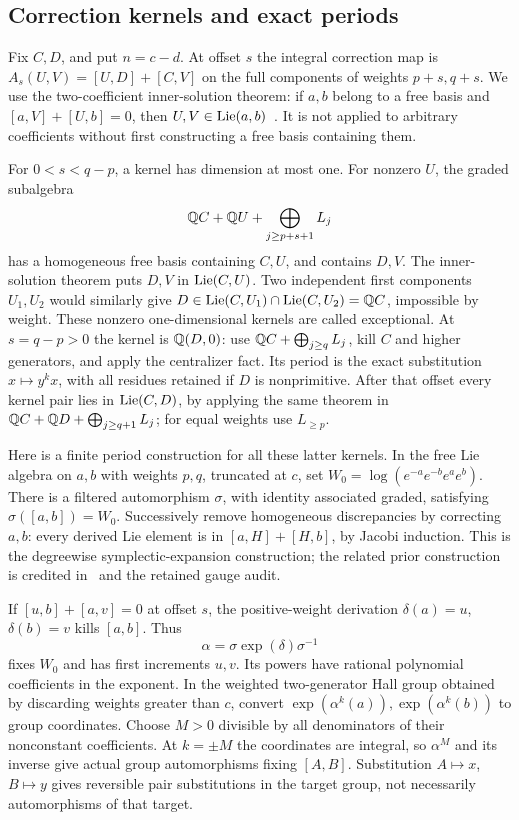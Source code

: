 \subsection{Correction kernels and exact periods}
Fix $C,D$, and put $n=c-d$. At offset $s$ the integral correction
map is $A_s(U,V)=[U,D]+[C,V]$ on the full components of weights
$p+s,q+s$. We use the two-coefficient inner-solution theorem:
if $a,b$ belong to a free basis and $[a,V]+[U,b]=0$, then
$U,V\in\operatorname{Lie}(a,b)$~\cite{remeslennikov-stoehr,altassan}. It is
not applied to arbitrary coefficients without first constructing
a free basis containing them.

For $0<s<q-p$, a kernel has dimension at most one. For nonzero
$U$, the graded subalgebra
\[
 \mathbb Q C+\mathbb Q U+\bigoplus_{j\ge p+s+1}L_j
\]
has a homogeneous free basis containing $C,U$, and contains $D,V$.
The inner-solution theorem puts $D,V$ in $\operatorname{Lie}(C,U)$. Two independent
first components $U_1,U_2$ would similarly give
$D\in\operatorname{Lie}(C,U_1)\cap\operatorname{Lie}(C,U_2)=\mathbb Q C$, impossible by weight.
These nonzero one-dimensional kernels are called exceptional.
At $s=q-p>0$ the kernel is $\mathbb Q(D,0)$: use
$\mathbb Q C+\bigoplus_{j\ge q}L_j$, kill $C$ and higher generators,
and apply the centralizer fact. Its period is the exact substitution
$x\mapsto y^kx$, with all residues retained if $D$ is nonprimitive.
After that offset every kernel pair lies in $\operatorname{Lie}(C,D)$, by applying
the same theorem in
$\mathbb Q C+\mathbb Q D+\bigoplus_{j\ge q+1}L_j$; for equal weights use
$L_{\ge p}$.

Here is a finite period construction for all these latter kernels.
In the free Lie algebra on $a,b$ with weights $p,q$, truncated at
$c$, set $W_0=\log(e^{-a}e^{-b}e^ae^b)$. There is a filtered
automorphism $\sigma$, with identity associated graded, satisfying
$\sigma([a,b])=W_0$. Successively remove homogeneous discrepancies
by correcting $a,b$: every derived Lie element is in
$[a,H]+[H,b]$, by Jacobi induction. This is the degreewise
symplectic-expansion construction; the related prior construction
is credited in~\cite{kuno} and the retained gauge audit.

If $[u,b]+[a,v]=0$ at offset $s$, the positive-weight derivation
$\delta(a)=u$, $\delta(b)=v$ kills $[a,b]$. Thus
\[
 \alpha=\sigma\exp(\delta)\sigma^{-1}
\]
fixes $W_0$ and has first increments $u,v$. Its powers have rational
polynomial coefficients in the exponent. In the weighted two-generator
Hall group obtained by discarding weights greater than $c$, convert
$\exp(\alpha^k(a)),\exp(\alpha^k(b))$ to group coordinates.
Choose $M>0$ divisible by all denominators of their nonconstant
coefficients. At $k=\pm M$ the coordinates are integral, so
$\alpha^M$ and its inverse give actual group automorphisms fixing
$[A,B]$. Substitution $A\mapsto x$, $B\mapsto y$ gives reversible
pair substitutions in the target group, not necessarily automorphisms
of that target.


